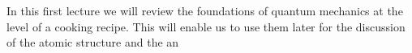 In this first lecture we will review the foundations of quantum mechanics at the level of a cooking recipe. This will enable us to use them later for the discussion of the atomic structure and the an